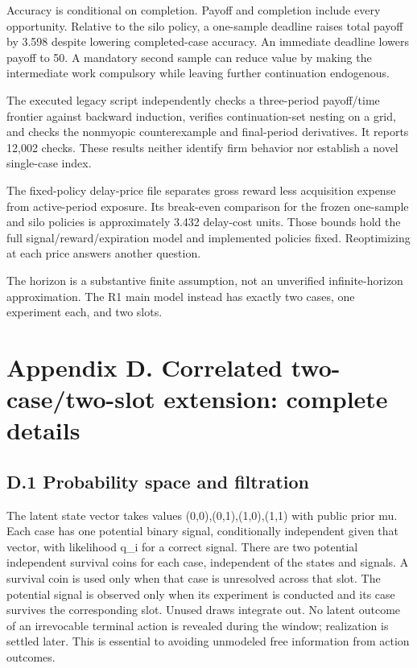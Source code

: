 \documentclass[
  11pt,
]{article}
\begin{document}
Accuracy is conditional on completion. Payoff and completion include
every opportunity. Relative to the silo policy, a one-sample deadline
raises total payoff by 3.598 despite lowering completed-case accuracy.
An immediate deadline lowers payoff to 50. A mandatory second sample can
reduce value by making the intermediate work compulsory while leaving
further continuation endogenous.

The executed legacy script independently checks a three-period
payoff/time frontier against backward induction, verifies
continuation-set nesting on a grid, and checks the nonmyopic
counterexample and final-period derivatives. It reports 12,002 checks.
These results neither identify firm behavior nor establish a novel
single-case index.

The fixed-policy delay-price file separates gross reward less
acquisition expense from active-period exposure. Its break-even
comparison for the frozen one-sample and silo policies is approximately
3.432 delay-cost units. Those bounds hold the full
signal/reward/expiration model and implemented policies fixed.
Reoptimizing at each price answers another question.

The horizon is a substantive finite assumption, not an unverified
infinite-horizon approximation. The R1 main model instead has exactly
two cases, one experiment each, and two slots.

\section{Appendix D. Correlated two-case/two-slot extension: complete
details}\label{appendix-d.-correlated-two-casetwo-slot-extension-complete-details}

\subsection{D.1 Probability space and
filtration}\label{d.1-probability-space-and-filtration}

The latent state vector takes values (0,0),(0,1),(1,0),(1,1) with public
prior mu. Each case has one potential binary signal, conditionally
independent given that vector, with likelihood q\_i for a correct
signal. There are two potential independent survival coins for each
case, independent of the states and signals. A survival coin is used
only when that case is unresolved across that slot. The potential signal
is observed only when its experiment is conducted and its case survives
the corresponding slot. Unused draws integrate out. No latent outcome of
an irrevocable terminal action is revealed during the window;
realization is settled later. This is essential to avoiding unmodeled
free information from action outcomes.
\end{document}
